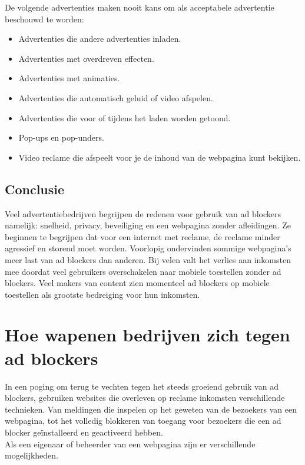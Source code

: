 \documentclass[pdftex,a4paper,12pt,twoside]{report}
\begin{document}
De volgende advertenties maken nooit kans om als acceptabele advertentie beschouwd te worden:

\begin{itemize}
	\item Advertenties die andere advertenties inladen. 
	\item Advertenties met overdreven effecten.
	\item Advertenties met animaties.
	\item Advertenties die automatisch geluid of video afspelen.
	\item Advertenties die voor of tijdens het laden worden getoond.
	\item Pop-ups en pop-unders.
	\item Video reclame die afspeelt voor je de inhoud van de webpagina kunt bekijken.
\end{itemize}

\section{Conclusie}
\label{sec Conclusie}
Veel advertentiebedrijven begrijpen de redenen voor gebruik van ad blockers namelijk: snelheid, privacy, beveiliging en een webpagina zonder afleidingen. Ze beginnen te begrijpen dat voor een internet met reclame, de reclame minder agressief en storend moet worden. Voorlopig ondervinden sommige webpagina's meer last van ad blockers dan anderen. Bij velen valt het verlies aan inkomsten mee doordat veel gebruikers overschakelen naar mobiele toestellen zonder ad blockers. Veel makers van content zien momenteel ad blockers op mobiele toestellen als grootste bedreiging voor hun inkomsten.


\chapter{Hoe wapenen bedrijven zich tegen ad blockers}
\label{ch:Hoe wapenen bedrijven zich tegen ad blockers}
In een poging om terug te vechten tegen het steeds groeiend gebruik van ad blockers, gebruiken websites die overleven op reclame inkomsten verschillende technieken. Van meldingen die inspelen op het geweten van de bezoekers van een webpagina, tot het volledig blokkeren van toegang voor bezoekers die een ad blocker geïnstalleerd en geactiveerd hebben.
\\
Als een eigenaar of beheerder van een webpagina zijn er verschillende mogelijkheden. 
\end{document}
